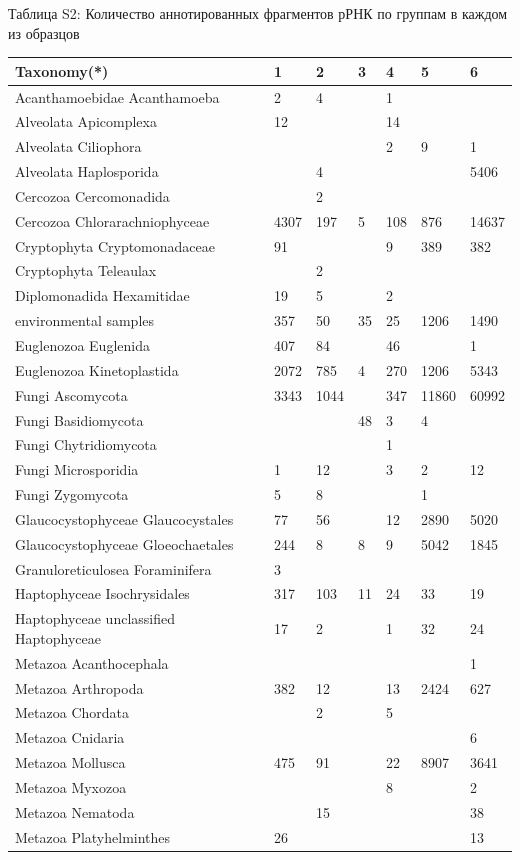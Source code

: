 \documentclass[a4paper]{article}
\begin{document}
Таблица S2: \small{Количество аннотированных фрагментов рРНК по группам в каждом из образцов}

\begin{tabular}{lllllll}
\hline
Taxonomy(*) &1&2&3&4&5&6\\
\hline
Acanthamoebidae Acanthamoeba&2&4& &1& &\\
Alveolata Apicomplexa&12&&&14& &\\
Alveolata Ciliophora&&&&2&9&1\\
Alveolata Haplosporida&&4&&&&5406\\
Cercozoa Cercomonadida&&2&&&&\\
Cercozoa Chlorarachniophyceae&4307&197&5&108&876&14637\\
Cryptophyta Cryptomonadaceae&91&&&9&389&382\\
Cryptophyta Teleaulax&&2&&&&\\
Diplomonadida Hexamitidae&19&5&&2&&\\
environmental samples&357&50&35&25&1206&1490\\
Euglenozoa Euglenida&407&84&&46&&1\\
Euglenozoa Kinetoplastida&2072&785&4&270&1206&5343\\
Fungi Ascomycota&3343&1044&&347&11860&60992\\
Fungi Basidiomycota&&&48&3&4&\\
Fungi Chytridiomycota&&&&1&&\\
Fungi Microsporidia&1&12&&3&2&12\\
Fungi Zygomycota&5&8&&&1&\\
Glaucocystophyceae Glaucocystales&77&56&&12&2890&5020\\
Glaucocystophyceae Gloeochaetales&244&8&8&9&5042&1845\\
Granuloreticulosea Foraminifera&3&&&&&\\
Haptophyceae Isochrysidales&317&103&11&24&33&19\\
Haptophyceae unclassified Haptophyceae&17&2&&1&32&24\\
Metazoa Acanthocephala&&&&&&1\\
Metazoa Arthropoda&382&12&&13&2424&627\\
Metazoa Chordata&&2&&5&&\\
Metazoa Cnidaria&&&&&&6\\
Metazoa Mollusca&475&91&&22&8907&3641\\
Metazoa Myxozoa&&&&8&&2\\
Metazoa Nematoda&&15&&&&38\\
Metazoa Platyhelminthes&26&&&&&13\\

\end{tabular}
\end{document}
